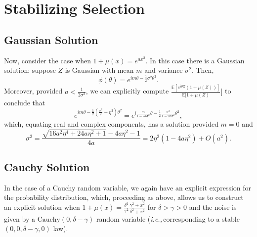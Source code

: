\documentclass[11pt]{amsart}
\theoremstyle{remark}
\theoremstyle{definition}
\newcommand{\ie}{\textit{i.e.,}\,}
\newcommand{\nb}{\textit{n.b.,}\, }
\begin{document}






\section{Stabilizing Selection}

\subsection{Gaussian Solution}

Now, consider the case when $1+ \mu(x) = e^{a x^{2}}$.  In this case there is a Gaussian solution: suppose $Z$ is Gaussian with mean $m$ and variance $\sigma^{2}$.  Then,
\[
	\phi(\theta) = e^{i m \theta - \frac{1}{2} \sigma^{2} \theta^{2}}.
\]
Moreover, provided $a < \frac{1}{2\sigma^{2}}$, we can explicitly compute $\frac{\mathbb{E}\left[e^{i \theta Z}(1+\mu(Z))\right]}{\mathbb{E}[1+\mu(Z)}]$  to conclude that
\[
	e^{i m \theta - \frac{1}{2} \left(\frac{\sigma^{2}}{2} + \eta^{2}\right)\theta^{2}}
	= e^{i \frac{m}{1-2 a \sigma^{2}}\theta 
		- \frac{1}{2} \frac{\sigma^{2}}{1-2 a \sigma^{2}}\theta^{2}},
\]
which, equating real and complex components, has a solution provided $m = 0$ and
\[
	\sigma^{2} = \frac{\sqrt{16 a^{2} \eta^{4} + 24 a \eta^{2}+1} - 4a \eta^{2} -1}{4a} 
	=  2\eta^{2}(1-4a\eta^{2}) + O(a^{2}).
\]

\subsection{Cauchy Solution}

In the case of a Cauchy random variable, we again have an explicit expression for the probability distribution, which, proceeding as above, allows us to construct an explicit solution when $1+ \mu(x) = \frac{\delta^{2}}{\gamma^{2}} \frac{\gamma^{2} + x^{2}}{\delta^{2} + x^{2}}$ for $\delta > \gamma > 0$ and the noise is given by a $\text{Cauchy}(0,\delta-\gamma)$ random variable (\ie corresponding to a stable $(0,0,\delta-\gamma,0)$ law).
\end{document}
